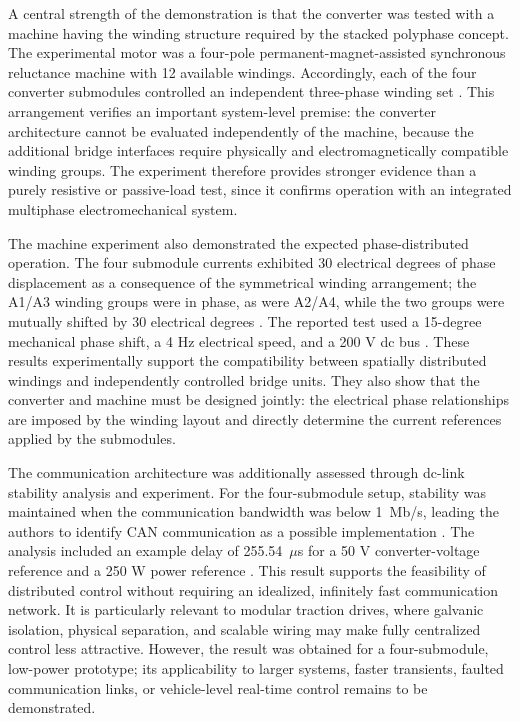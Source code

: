 A central strength of the demonstration is that the converter was tested with a machine having the winding structure required by the stacked polyphase concept. The experimental motor was a four-pole permanent-magnet-assisted synchronous reluctance machine with 12 available windings. Accordingly, each of the four converter submodules controlled an independent three-phase winding set \cite{Jin2017}. This arrangement verifies an important system-level premise: the converter architecture cannot be evaluated independently of the machine, because the additional bridge interfaces require physically and electromagnetically compatible winding groups. The experiment therefore provides stronger evidence than a purely resistive or passive-load test, since it confirms operation with an integrated multiphase electromechanical system.

The machine experiment also demonstrated the expected phase-distributed operation. The four submodule currents exhibited 30 electrical degrees of phase displacement as a consequence of the symmetrical winding arrangement; the A1/A3 winding groups were in phase, as were A2/A4, while the two groups were mutually shifted by 30 electrical degrees \cite{Jin2017}. The reported test used a 15-degree mechanical phase shift, a 4 Hz electrical speed, and a 200 V dc bus \cite{Jin2017}. These results experimentally support the compatibility between spatially distributed windings and independently controlled bridge units. They also show that the converter and machine must be designed jointly: the electrical phase relationships are imposed by the winding layout and directly determine the current references applied by the submodules.

The communication architecture was additionally assessed through dc-link stability analysis and experiment. For the four-submodule setup, stability was maintained when the communication bandwidth was below 1~Mb/s, leading the authors to identify CAN communication as a possible implementation \cite{Jin2017}. The analysis included an example delay of 255.54~$\mu$s for a 50 V converter-voltage reference and a 250 W power reference \cite{Jin2017}. This result supports the feasibility of distributed control without requiring an idealized, infinitely fast communication network. It is particularly relevant to modular traction drives, where galvanic isolation, physical separation, and scalable wiring may make fully centralized control less attractive. However, the result was obtained for a four-submodule, low-power prototype; its applicability to larger systems, faster transients, faulted communication links, or vehicle-level real-time control remains to be demonstrated. %

